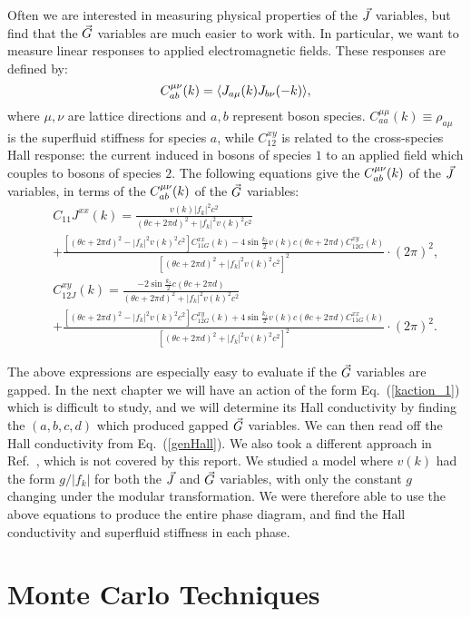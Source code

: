 Often we are interested in measuring physical properties of the $\vec{J}$ variables, but find that the $\vec{G}$ variables are much easier to work with. In particular, we want to measure linear responses to applied electromagnetic fields. These responses are defined by:
\begin{equation}
C^{\mu\nu}_{ab}(k)=\langle J_{a\mu}(k) J_{b\nu}(-k)\rangle,
\end{equation}
where $\mu,\nu$ are lattice directions and $a,b$ represent boson species. $C^{\mu\mu}_{aa}(k)\equiv \rho_{a\mu}$ is the superfluid stiffness for species $a$, while $C^{xy}_{12}$ is related to the cross-species Hall response: the current induced in bosons of species $1$ to an applied field which couples to bosons of species $2$. The following equations give the $C^{\mu\nu}_{ab}(k)$ of the $\vec{J}$ variables, in terms of the $C^{\mu\nu}_{ab}(k)$ of the $\vec{G}$ variables:
\begin{eqnarray}
&&C_{11}J^{xx}(k)=\frac{v(k)|f_k|^2c^2}{(\theta c+2\pi d)^2+|f_k|^2v(k)^2c^2}\\
&&+\frac{[(\theta c+2\pi d)^2-|f_k|^2v(k)^2c^2]C_{11G}^{xx}(k)-4\sin{\frac{k_z}{2}}v(k)c(\theta c+2\pi d)C_{12G}^{xy}(k)}{[(\theta c+2\pi d)^2+|f_k|^2v(k)^2c^2]^2}\cdot (2\pi)^2,\nonumber\\
&&C_{12J}^{xy}(k)=\frac{-2\sin{\frac{k_z}{2}}c(\theta c+2\pi d)}{(\theta c+2\pi d)^2+|f_k|^2v(k)^2c^2}\label{genHall}\\
&&+\frac{[(\theta c+2\pi d)^2-|f_k|^2v(k)^2c^2]C_{12G}^{xy}(k)+4\sin{\frac{k_z}{2}}v(k)c(\theta c+2\pi d)C_{11G}^{xx}(k)}{[(\theta c+2\pi d)^2+|f_k|^2v(k)^2c^2]^2}\cdot (2\pi)^2.\nonumber
\end{eqnarray}

The above expressions are especially easy to evaluate if the $\vec{G}$ variables are gapped. In the next chapter we will have an action of the form Eq.~(\ref{kaction_1}) which is difficult to study, and we will determine its Hall conductivity by finding the $(a,b,c,d)$ which produced gapped $\vec{G}$ variables. We can then read off the Hall conductivity from Eq.~(\ref{genHall}). We also took a different approach in Ref.~\cite{Gen2Loops}, which is not covered by this report. We studied a model where $v(k)$ had the form $g/|f_k|$ for both the $\vec{J}$ and $\vec{G}$ variables, with only the constant $g$ changing under the modular transformation. We were therefore able to use the above equations to produce the entire phase diagram, and find the Hall conductivity and superfluid stiffness in each phase.

\section{Monte Carlo Techniques}

